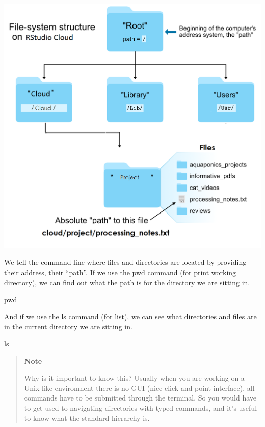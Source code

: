 \documentclass[
]{book}
\newenvironment{Shaded}{\begin{snugshade}}{\end{snugshade}}
\newcommand{\BuiltInTok}[1]{#1}
\newcommand{\FunctionTok}[1]{\textcolor[rgb]{0.00,0.00,0.00}{#1}}
\begin{document}
\begin{center}\includegraphics[width=0.8\linewidth]{images/file_system_structure} \end{center}

We tell the command line where files and directories are located by providing their address, their ``path''. If we use the pwd command (for print working directory), we can find out what the path is for the directory we are sitting in.

\begin{Shaded}
\begin{Highlighting}[]
    \BuiltInTok{pwd}
\end{Highlighting}
\end{Shaded}

And if we use the ls command (for list), we can see what directories and files are in the current directory we are sitting in.

\begin{Shaded}
\begin{Highlighting}[]
    \FunctionTok{ls}
\end{Highlighting}
\end{Shaded}

\begin{quote}
\textbf{Note}

Why is it important to know this? Usually when you are working on a Unix-like environment there is no GUI (nice-click and point interface), all commands have to be submitted through the terminal. So you would have to get used to navigating directories with typed commands, and it's useful to know what the standard hierarchy is.
\end{quote}
\end{document}
